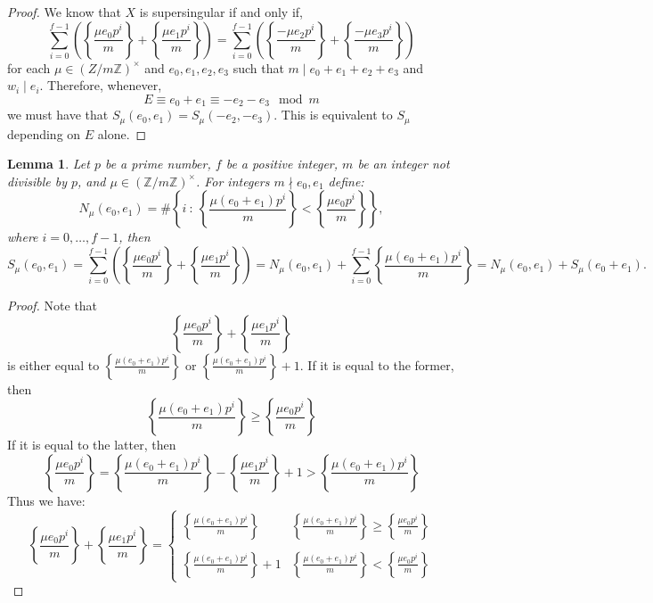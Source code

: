 \documentclass{article}
\newcommand{\Z}{\mathbb{Z}}
\newcommand{\divides}{\mid}
\newtheorem{lemma}[theorem]{Lemma}
\theoremstyle{definition}
\theoremstyle{definition}
\theoremstyle{remark}
\begin{document}
\begin{proof}
We know that $X$ is supersingular if and only if,
\begin{equation*}
\sum_{i = 0}^{f-1} \left( \left\{\frac{\mu e_0p^i}{m}\right\} + \left\{\frac{\mu e_1p^i}{m}\right\} \right) 
= \sum_{i = 0}^{f-1} \left( \left\{\frac{-\mu e_2p^i}{m}\right\} + \left\{\frac{-\mu e_3p^i}{m}\right\} \right)
\end{equation*}
for each $\mu \in (Z / m \Z)^\times$ and $e_0, e_1, e_2, e_3$ such that $m \divides e_0 + e_1 + e_2 + e_3$ and $w_i \divides e_i$. Therefore, whenever,
\[ E \equiv e_0 + e_1 \equiv -e_2 -e_3 \mod{m} \]
we must have that $S_\mu(e_0, e_1) = S_\mu(-e_2, -e_3)$. This is equivalent to $S_\mu$ depending on $E$ alone. 
\end{proof}


\begin{lemma}
\label{lem:sum_frac_part_N(e_0,e_1)}
Let $p$ be a prime number, $f$ be a positive integer, $m$ be an integer not divisible by $p$, and $\mu \in (\Z / m \Z)^\times$. For integers $m \nmid e_0, e_1$ define:
\[N_\mu(e_0, e_1) = \#\left\{i \ : \ \left\{\frac{\mu (e_0 + e_1)p^i}{m}\right\} < \left\{\frac{\mu e_0 p^i}{m}\right\} \right\},\] 
where $i = 0, \dots, f-1$, then
\[ S_\mu(e_0, e_1) = \sum_{i = 0}^{f-1} \left( \left\{\frac{\mu e_0p^i}{m}\right\} + \left\{\frac{\mu e_1p^i}{m}\right\} \right) = N_\mu(e_0, e_1) + \sum_{i = 0}^{f-1}  \left\{\frac{\mu (e_0 + e_1)p^i}{m}\right\} = N_\mu(e_0, e_1) + S_\mu(e_0 + e_1).
\]
\end{lemma}
\begin{proof}
Note that 
\[\left\{\frac{\mu e_0p^i}{m}\right\} + \left\{\frac{\mu e_1p^i}{m}\right\}\]
is either equal to $\left\{\frac{\mu (e_0 + e_1)p^i}{m}\right\}$ or $\left\{\frac{\mu (e_0 + e_1)p^i}{m}\right\} + 1$. If it is equal to the former, then
\[\left\{\frac{\mu (e_0 + e_1)p^i}{m}\right\} \ge \left\{\frac{\mu e_0p^i}{m}\right\} \]
If it is equal to the latter, then
\[\left\{\frac{\mu e_0p^i}{m}\right\} = \left\{\frac{\mu (e_0 + e_1)p^i}{m}\right\} - \left\{\frac{\mu e_1p^i}{m}\right\} + 1 > \left\{\frac{\mu (e_0 + e_1)p^i}{m}\right\}\]
Thus we have:
\[\left\{\frac{\mu e_0p^i}{m}\right\} + \left\{\frac{\mu e_1p^i}{m}\right\} = \begin{cases} \left\{\frac{\mu (e_0 + e_1)p^i}{m}\right\} & \left\{\frac{\mu (e_0 + e_1)p^i}{m}\right\} \ge \left\{\frac{\mu e_0 p^i}{m}\right\} \\ 
& \\ 
\left\{\frac{\mu (e_0 + e_1)p^i}{m}\right\} + 1 & \left\{\frac{\mu (e_0 + e_1)p^i}{m}\right\} < \left\{\frac{\mu e_0 p^i}{m}\right\} \end{cases} \]
\end{proof}
\end{document}
